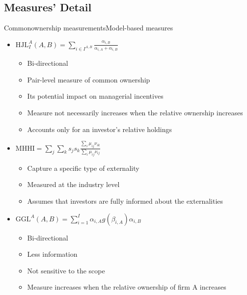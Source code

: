 \documentclass{beamer}
\begin{document}
	
	
	
	
	\subsection{Measures' Detail}
	\begin{frame}{Commonownership measurements}{Model-based measures }\label{measuredetail}
		
		\begin{itemize}
			\item \color{cyan} \scriptsize $
			\text{HJL}_I^A(A,B) = \sum_{i\in I^{A,B}}\frac{\alpha_{i,B}}{\alpha_{i,A} + \alpha_{i,B}}     $  \normalcolor
			\tiny \cite{harford2011institutional} \\ 
			\begin{itemize}
				\item Bi-directional
				\item Pair-level measure of common ownership
				\item Its potential impact on managerial incentives
				\item Measure not necessarily increases  when the relative ownership increases
				\item Accounts  only for an investor’s relative holdings
			\end{itemize}
			\normalsize
			\item \color{cyan} \scriptsize$   \text{MHHI} = \sum_{j} \sum_k s_j s_k \frac{\sum_i \mu_{ij} \nu_{ik}}{\sum_i \mu_{ij} \nu_{ij}}   $ \tiny   \normalcolor
			\cite{azar2018anticompetitive}  \\ 
			\begin{itemize}
				\item Capture a specific   type of externality
				\item Measured at the industry level
				\item Assumes that investors are fully   informed about the externalities 
			\end{itemize}
			\normalsize
			
			\item \color{cyan} \scriptsize$   \text{GGL}^A(A,B) = \sum_{i = 1}^{I} \alpha_{i,A}g(\beta_{i,A})\alpha_{i,B}   $ \tiny \normalcolor 
			\cite{gilje2020s}
			\\ 
			\begin{itemize}
				\item Bi-directional
				\item Less information
				\item Not sensitive to  the scope
				\item Measure increases   when the relative ownership of firm A increases
			\end{itemize}
			\normalsize
		\end{itemize}
		
		
	\end{frame}
	
\end{document}
